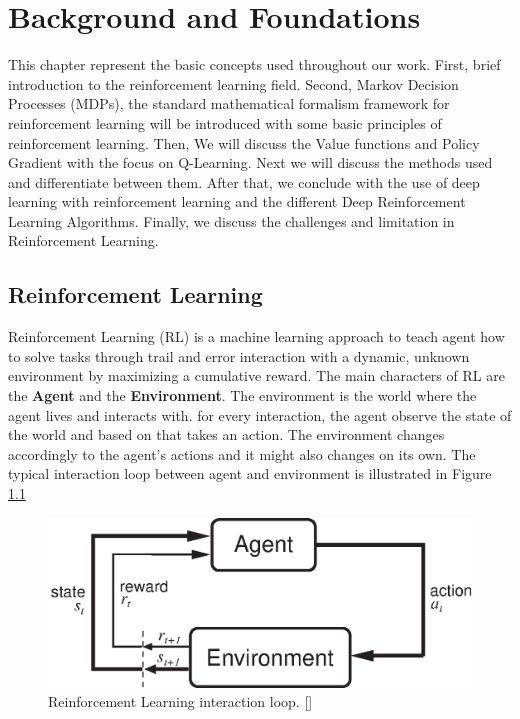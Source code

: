 
\chapter{Background and Foundations}\label{chapter:Background and Foundations}

This chapter represent the basic concepts used throughout our work. First, brief introduction to the reinforcement learning field. Second, Markov Decision Processes (MDPs), the standard mathematical formalism framework for reinforcement learning will be introduced with some basic principles of reinforcement learning. Then, We will discuss the Value functions and Policy Gradient with the focus on Q-Learning. Next we will discuss the methods used and differentiate between them. After that, we conclude with  the use of deep learning with reinforcement learning and the different Deep Reinforcement Learning Algorithms. Finally, we  discuss the challenges and limitation in Reinforcement Learning.

\section{Reinforcement Learning}
Reinforcement Learning (RL) is a machine learning approach to teach agent how to solve tasks through trail and error interaction with a dynamic, unknown environment by maximizing a cumulative reward. The main characters of RL are the \textbf{Agent} and the \textbf{Environment}. The environment is the world where the agent lives and interacts with. for every interaction, the agent observe the state of the world and based on that takes an action. The environment changes accordingly to the agent's actions and it might also changes on its own. The typical interaction loop between agent and environment is illustrated in Figure \ref{fig:Agent_Env}

\begin{figure}
  \includegraphics[width=\linewidth]{figures/Agent-Env.eps}
  \caption{Reinforcement Learning interaction loop. []}
  \label{fig:Agent_Env}
\end{figure}

